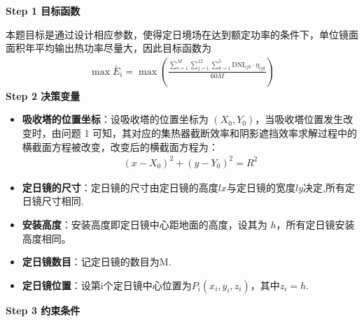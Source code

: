 \documentclass[../main.tex]{subfiles}
\begin{document}
  \noindent \textbf{Step 1 目标函数}
  \par 本题目标是通过设计相应参数，使得定日境场在达到额定功率的条件下，单位镜面面积年平均输出热功率尽量大，因此目标函数为
  \begin{align}\label{2.1}
    \max \bar{E}_i = \max\left( \frac{\sum_{i=1}^{M} \sum_{j=1}^{12} \sum_{k=1}^{5} \text{DNI}_{ijk} \cdot \eta_{ijk}}{60M} \right)
  \end{align}
  \noindent \textbf{Step 2 决策变量}
   \begin{itemize}
  \item \textbf{吸收塔的位置坐标}：设吸收塔的位置坐标为 \((X_0, Y_0)\)，当吸收塔位置发生改变时，由问题 1 可知，其对应的集热器截断效率和阴影遮挡效率求解过程中的横截面方程被改变，改变后的横截面方程为：
  \begin{align}\label{2.2}
    (x - X_0)^2 + (y - Y_0)^2 = R^2
  \end{align}
  \item \textbf{定日镜的尺寸}：定日镜的尺寸由定日镜的高度\(lx\)与定日镜的宽度\(ly\)决定,所有定日镜尺寸相同.
  \item \textbf{安装高度}：安装高度即定日镜中心距地面的高度，设其为 \(h\)，所有定日镜安装高度相同。
  \item \textbf{定日镜数目}：记定日镜的数目为M.
  \item \textbf{定日镜位置}：设第i个定日镜中心位置为$P_{i}(x_i,y_i,z_i)$，其中$z_i=h$.
  \end{itemize}
\noindent \textbf{Step 3 约束条件}
\end{document}
